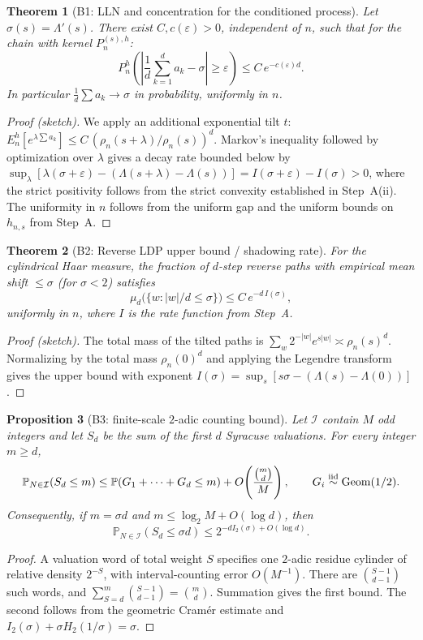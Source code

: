 \documentclass[12pt,a4paper]{article}
\newtheorem{theorem}{Theorem}[section]
\newtheorem{proposition}[theorem]{Proposition}
\begin{document}
\begin{theorem}[B1: LLN and concentration for the conditioned process]
Let $\sigma(s)=\Lambda'(s)$. There exist $C,c(\varepsilon)>0$, independent of $n$, such that for the chain with kernel $P_n^{(s),h}$:
\[
P_n^{h}\left(\left|\frac1d\sum_{k=1}^d a_k-\sigma\right|\ge\varepsilon\right)\le C\,e^{-c(\varepsilon)d}.
\]
In particular $\frac1d\sum a_k\to\sigma$ in probability, uniformly in $n$.
\end{theorem}
\begin{proof}[Proof (sketch)]
We apply an additional exponential tilt $t$: $E_n^{h}[e^{\lambda\sum a_k}]\le C\,(\rho_n(s+\lambda)/\rho_n(s))^d$. Markov's inequality followed by optimization over $\lambda$ gives a decay rate bounded below by $\sup_\lambda[\lambda(\sigma+\varepsilon)-(\Lambda(s+\lambda)-\Lambda(s))]=I(\sigma+\varepsilon)-I(\sigma)>0$, where the strict positivity follows from the strict convexity established in Step~A(ii). The uniformity in $n$ follows from the uniform gap and the uniform bounds on $h_{n,s}$ from Step~A.
\end{proof}

\begin{theorem}[B2: Reverse LDP upper bound / shadowing rate]
For the cylindrical Haar measure, the fraction of $d$-step reverse paths with empirical mean shift $\le\sigma$ (for $\sigma<2$) satisfies
\[
\mu_d\big(\{w : |w|/d\le\sigma\}\big)\le C\,e^{-d\,I(\sigma)},
\]
uniformly in $n$, where $I$ is the rate function from Step~A.
\end{theorem}
\begin{proof}[Proof (sketch)]
The total mass of the tilted paths is $\sum_{w}2^{-|w|}e^{s|w|}\asymp\rho_n(s)^d$. Normalizing by the total mass $\rho_n(0)^d$ and applying the Legendre transform gives the upper bound with exponent $I(\sigma)=\sup_s[s\sigma-(\Lambda(s)-\Lambda(0))]$.
\end{proof}

\begin{proposition}[B3: finite-scale $2$-adic counting bound]
\label{prop:finite_scale_2adic}
Let $\mathcal I$ contain $M$ odd integers and let $S_d$ be the sum of the
first $d$ Syracuse valuations.  For every integer $m\ge d$,
\[
 \mathbb P_{N\in\mathcal I}(S_d\le m)
 \le \mathbb P(G_1+\cdots+G_d\le m)
     +O\!\left(\frac{\binom md}{M}\right),
 \qquad G_i\stackrel{\rm iid}{\sim}{\rm Geom}(1/2).
\]
Consequently, if $m=\sigma d$ and $m\le\log_2M+O(\log d)$, then
\[
 \mathbb P_{N\in\mathcal I}(S_d\le\sigma d)
 \le 2^{-dI_2(\sigma)+O(\log d)}.
\]
\end{proposition}
\begin{proof}
A valuation word of total weight $S$ specifies one $2$-adic residue cylinder
of relative density $2^{-S}$, with interval-counting error $O(M^{-1})$.
There are $\binom{S-1}{d-1}$ such words, and
$\sum_{S=d}^m\binom{S-1}{d-1}=\binom md$.  Summation gives the first bound.
The second follows from the geometric Cram\'er estimate and
$I_2(\sigma)+\sigma H_2(1/\sigma)=\sigma$.
\end{proof}
\end{document}

